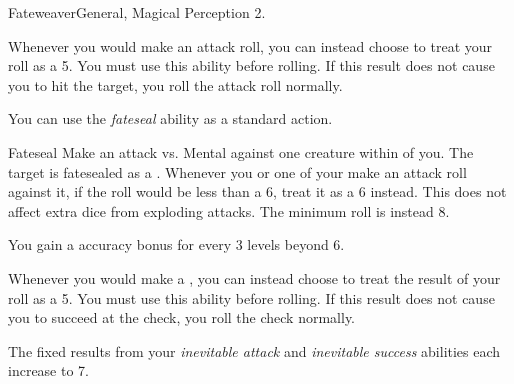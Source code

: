     \begin{feat}{Fateweaver}{General, Magical}
        \featpre Perception 2.

         Whenever you would make an attack roll, you can instead choose to treat your roll as a 5.
        You must use this ability before rolling.
        If this result does not cause you to hit the target, you roll the attack roll normally.

         You can use the \textit{fateseal} ability as a standard action.
        \begin{magicalactiveability}{Fateseal}
            Make an attack vs. Mental against one creature within \medrange of you.
            \hit The target is fatesealed as a .
            Whenever you or one of your  make an attack roll against it, if the roll would be less than a 6, treat it as a 6 instead.
            This does not affect extra dice from exploding attacks.
            \crit The minimum roll is instead 8.

            \rankline
            You gain a  accuracy bonus for every 3 levels beyond 6.
        \end{magicalactiveability}

         Whenever you would make a , you can instead choose to treat the result of your roll as a 5.
        You must use this ability before rolling.
        If this result does not cause you to succeed at the check, you roll the check normally.

         The fixed results from your \textit{inevitable attack} and \textit{inevitable success} abilities each increase to 7.
    \end{feat}



